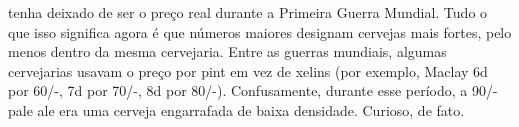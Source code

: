 tenha deixado de ser o preço real durante a Primeira Guerra Mundial. Tudo o que isso significa agora é que números maiores designam cervejas mais fortes, pelo menos dentro da mesma cervejaria. Entre as guerras mundiais, algumas cervejarias usavam o preço por pint em vez de xelins (por exemplo, Maclay 6d por 60/-, 7d por 70/-, 8d por 80/-). Confusamente, durante esse período, a 90/- pale ale era uma cerveja engarrafada de baixa densidade. Curioso, de fato.
